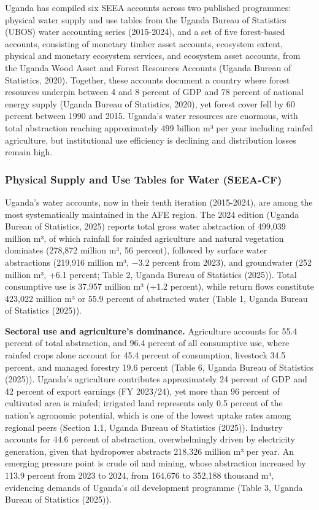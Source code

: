 \documentclass[
  letterpaper,
  DIV=11,
  numbers=noendperiod]{scrartcl}
\begin{document}
Uganda has compiled six SEEA accounts across two published programmes:
physical water supply and use tables from the Uganda Bureau of
Statistics (UBOS) water accounting series (2015-2024), and a set of five
forest-based accounts, consisting of monetary timber asset accounts,
ecosystem extent, physical and monetary ecosystem services, and
ecosystem asset accounts, from the Uganda Wood Asset and Forest
Resources Accounts (Uganda Bureau of Statistics, 2020). Together, these
accounts document a country where forest resources underpin between 4
and 8 percent of GDP and 78 percent of national energy supply (Uganda
Bureau of Statistics, 2020), yet forest cover fell by 60 percent between
1990 and 2015. Uganda's water resources are enormous, with total
abstraction reaching approximately 499 billion m³ per year including
rainfed agriculture, but institutional use efficiency is declining and
distribution losses remain high.

\subsubsection{Physical Supply and Use Tables for Water
(SEEA-CF)}\label{physical-supply-and-use-tables-for-water-seea-cf-1}

Uganda's water accounts, now in their tenth iteration (2015-2024), are
among the most systematically maintained in the AFE region. The 2024
edition (Uganda Bureau of Statistics, 2025) reports total gross water
abstraction of 499,039 million m³, of which rainfall for rainfed
agriculture and natural vegetation dominates (278,872 million m³, 56
percent), followed by surface water abstractions (219,916 million m³,
−3.2 percent from 2023), and groundwater (252 million m³, +6.1 percent;
Table 2, Uganda Bureau of Statistics (2025)). Total consumptive use is
37,957 million m³ (+1.2 percent), while return flows constitute 423,022
million m³ or 55.9 percent of abstracted water (Table 1, Uganda Bureau
of Statistics (2025)).

\textbf{Sectoral use and agriculture's dominance.} Agriculture accounts
for 55.4 percent of total abstraction, and 96.4 percent of all
consumptive use, where rainfed crops alone account for 45.4 percent of
consumption, livestock 34.5 percent, and managed forestry 19.6 percent
(Table 6, Uganda Bureau of Statistics (2025)). Uganda's agriculture
contributes approximately 24 percent of GDP and 42 percent of export
earnings (FY 2023/24), yet more than 96 percent of cultivated area is
rainfed; irrigated land represents only 0.5 percent of the nation's
agronomic potential, which is one of the lowest uptake rates among
regional peers (Section 1.1, Uganda Bureau of Statistics (2025)).
Industry accounts for 44.6 percent of abstraction, overwhelmingly driven
by electricity generation, given that hydropower abstracts 218,326
million m³ per year. An emerging pressure point is crude oil and mining,
whose abstraction increased by 113.9 percent from 2023 to 2024, from
164,676 to 352,188 thousand m³, evidencing demands of Uganda's oil
development programme (Table 3, Uganda Bureau of Statistics (2025)).
\end{document}

